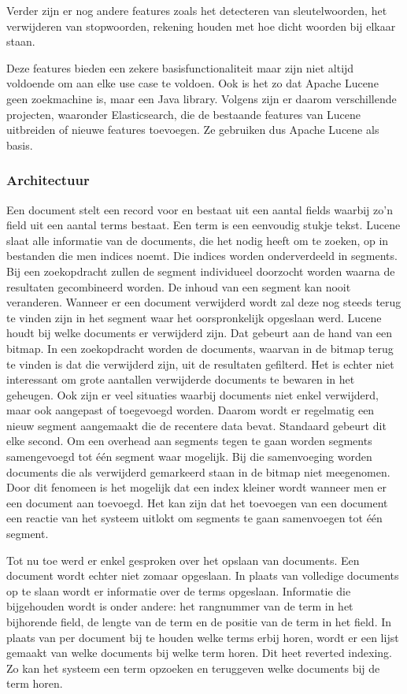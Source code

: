 Verder zijn er nog andere features zoals het detecteren van sleutelwoorden, het verwijderen van stopwoorden, rekening houden met hoe dicht woorden bij elkaar staan.

Deze features bieden een zekere basisfunctionaliteit maar zijn niet altijd voldoende om aan elke use case te voldoen. Ook is het zo dat Apache Lucene geen zoekmachine is, maar een Java library. Volgens \textcite{Whissel2009} zijn er daarom verschillende projecten, waaronder Elasticsearch, die de bestaande features van Lucene uitbreiden of nieuwe features toevoegen. Ze gebruiken dus Apache Lucene als basis.

\subsubsection{Architectuur}

Een document stelt een record voor en bestaat uit een aantal fields waarbij zo’n field uit een aantal terms bestaat. Een term is een eenvoudig stukje tekst. Lucene slaat alle informatie van de documents, die het nodig heeft om te zoeken, op in bestanden die men indices noemt. Die indices worden onderverdeeld in segments. Bij een zoekopdracht zullen de segment individueel doorzocht worden waarna de resultaten gecombineerd worden. De inhoud van een segment kan nooit veranderen. Wanneer er een document verwijderd wordt zal deze nog steeds terug te vinden zijn in het segment waar het oorspronkelijk opgeslaan werd. Lucene houdt bij welke documents er verwijderd zijn. Dat gebeurt aan de hand van een bitmap. In een zoekopdracht worden de documents, waarvan in de bitmap terug te vinden is dat die verwijderd zijn, uit de resultaten gefilterd. Het is echter niet interessant om grote aantallen verwijderde documents te bewaren in het geheugen. Ook zijn er veel situaties waarbij documents niet enkel verwijderd, maar ook aangepast of toegevoegd worden. Daarom wordt er regelmatig een nieuw segment aangemaakt die de recentere data bevat. Standaard gebeurt dit elke second. Om een overhead aan segments tegen te gaan worden segments samengevoegd tot één segment waar mogelijk. Bij die samenvoeging worden documents die als verwijderd gemarkeerd staan in de bitmap niet meegenomen. Door dit fenomeen is het mogelijk dat een index kleiner wordt wanneer men er een document aan toevoegd. Het kan zijn dat het toevoegen van een document een reactie van het systeem uitlokt om segments te gaan samenvoegen tot één segment. \autocite{Brasetvik2017}

Tot nu toe werd er enkel gesproken over het opslaan van documents. Een document wordt echter niet zomaar opgeslaan. In plaats van volledige documents op te slaan wordt er informatie over de terms opgeslaan. Informatie die bijgehouden wordt is onder andere: het rangnummer van de term in het bijhorende field, de lengte van de term en de positie van de term in het field. In plaats van per document bij te houden welke terms erbij horen, wordt er een lijst gemaakt van welke documents bij welke term horen. Dit heet reverted indexing. Zo kan het systeem een term opzoeken en teruggeven welke documents bij de term horen. \autocite{Whissel2009}

